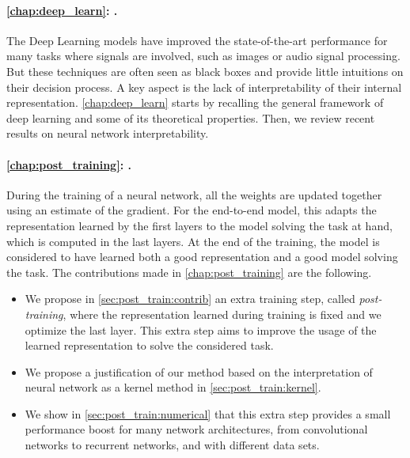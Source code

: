 \documentclass[../thesis.tex]{subfiles}
\begin{document}
\paragraph{\autoref{chap:deep_learn}: .}
\label{par:contrib:deep_learn}

The Deep Learning models have improved the state-of-the-art performance for many tasks where signals are involved, such as images or audio signal processing. But these techniques are often seen as black boxes and provide little intuitions on their decision process. A key aspect is the lack of interpretability of their internal representation. \autoref{chap:deep_learn} starts by recalling the general framework of deep learning and some of its theoretical properties. Then, we review recent results on neural network interpretability.




\paragraph{\autoref{chap:post_training}: .}
\label{par:contrib:post_traing}

During the training of a neural network, all the weights are updated together using an estimate of the gradient. For the end-to-end model, this adapts the representation learned by the first layers to the model solving the task at hand, which is computed in the last layers. At the end of the training, the model is considered to have learned both a good representation and a good model solving the task. The contributions made in \autoref{chap:post_training} are the following.

\begin{itemize}\itemsep.3em
	\renewcommand{\labelitemi}{\raisebox{-.1em}{\color{linkcolor!50}$\blacktriangleright$}}

	\item We propose in \autoref{sec:post_train:contrib} an extra training step, called
	\emph{post-training}, where the representation learned during training is fixed and
	we optimize the last layer. This extra step aims to improve the usage of the learned
	representation to solve the considered task.

	\item We propose a justification of our method based on the interpretation of neural
	network as a kernel method in \autoref{sec:post_train:kernel}.

	\item We show in \autoref{sec:post_train:numerical} that this extra step provides a
	small performance boost for many network architectures, from convolutional networks to
	recurrent networks, and with different data sets.

\end{itemize}
\end{document}

